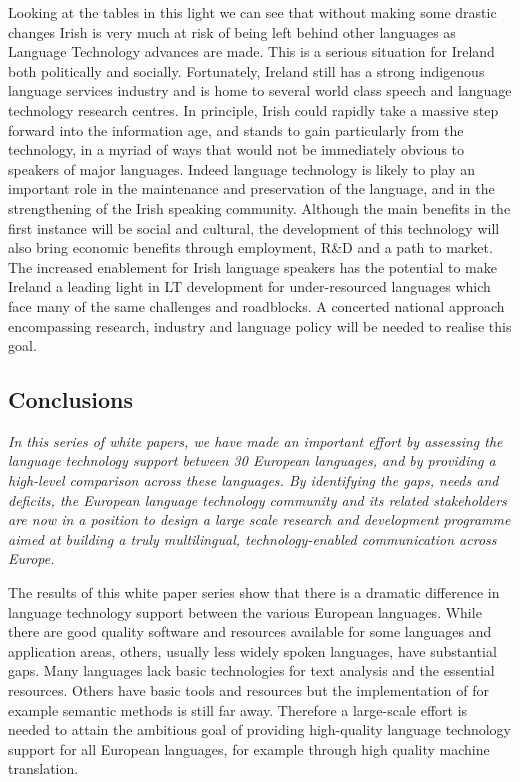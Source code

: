 \begin{multicols}{2}
Looking at the tables in this light we can see that without making some drastic changes Irish is very much at risk of being left behind other languages as Language Technology advances are made. This is a serious situation for Ireland both politically and socially. Fortunately, Ireland still has a strong indigenous language services industry and is home to several world class speech and language technology research centres. In principle, Irish could rapidly take a massive step forward into the information age, and stands to gain particularly from the technology, in a myriad of ways that would not be immediately obvious to speakers of major languages. Indeed language technology is likely to play an important role in the maintenance and preservation of the language, and in the strengthening of the Irish speaking community. Although the main benefits in the first instance will be social and cultural, the development of this technology will also bring economic benefits through employment, R\&D and a path to market. The increased enablement for Irish language speakers has the potential to make Ireland a leading light in LT development for under-resourced languages which face many of the same challenges and roadblocks. A concerted national approach encompassing research, industry and language policy will be needed to realise this goal.

\subsection{Conclusions}

\emph{In this series of white papers, we have made an important effort by assessing the language technology support between 30 European languages, and by providing a high-level comparison across these languages. By identifying the gaps, needs and deficits, the European language technology community and its related stakeholders are now in a position to design a large scale research and development programme aimed at building a truly multilingual, technology-enabled communication across Europe.}

The results of this white paper series show that there is a dramatic difference in language technology support between the various European languages. While there are good quality software and resources available for some languages and application areas, others, usually less widely spoken languages, have substantial gaps. Many languages lack basic technologies for text analysis and the essential resources. Others have basic tools and resources but the implementation of for example semantic methods is still far away. Therefore a large-scale effort is needed to attain the ambitious goal of providing high-quality language technology support for all European languages, for example through high quality machine translation. 


\end{multicols}
